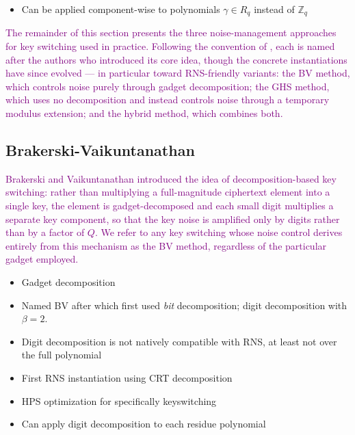 \begin{itemize}
    \item Can be applied component-wise to polynomials $\gamma\in R_q$ instead of $\mathbb{Z}_q$
\end{itemize}

\textcolor{purple}{
The remainder of this section presents the three noise-management approaches for key switching used in practice. Following the convention of \cite{cryptoeprint:2021/204}, each is named after the authors who introduced its core idea, though the concrete instantiations have since evolved — in particular toward RNS-friendly variants: the BV method, which controls noise purely through gadget decomposition; the GHS method, which uses no decomposition and instead controls noise through a temporary modulus extension; and the hybrid method, which combines both.
}

\subsection{Brakerski-Vaikuntanathan}
\textcolor{purple}{
Brakerski and Vaikuntanathan \cite{cryptoeprint:2011/277} introduced the idea of decomposition-based key switching: rather than multiplying a full-magnitude ciphertext element into a single key, the element is gadget-decomposed and each small digit multiplies a separate key component, so that the key noise is amplified only by digits rather than by a factor of $Q$. We refer to any key switching whose noise control derives entirely from this mechanism as the BV method, regardless of the particular gadget employed.
}

\begin{itemize}
    \item Gadget decomposition
    \item Named BV after \cite{bv} which first used \textit{bit} decomposition; digit decomposition with $\beta = 2$.
    \item Digit decomposition is not natively compatible with RNS, at least not over the full polynomial
    \item First RNS instantiation using CRT decomposition \cite{cryptoeprint:2016/510}
    \item HPS optimization for specifically keyswitching \cite{cryptoeprint:2018/117}
    \item Can apply digit decomposition to each residue polynomial
\end{itemize}

